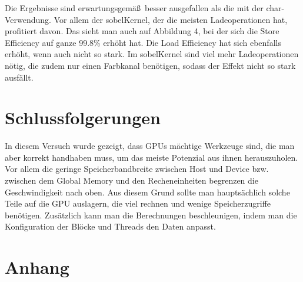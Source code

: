 \documentclass[12pt,a4paper]{scrartcl}
\begin{document}
Die Ergebnisse sind erwartungsgem\"a\ss\ besser ausgefallen als die mit der char-Verwendung.
Vor allem der sobelKernel, der die meisten Ladeoperationen hat, profitiert davon.
Das sieht man auch auf Abbildung 4, bei der sich die Store Efficiency auf ganze 99.8\% erh\"oht hat.
Die Load Efficiency hat sich ebenfalls erh\"oht, wenn auch nicht so stark.
Im sobelKernel sind viel mehr Ladeoperationen n\"otig, die zudem nur einen Farbkanal ben\"otigen, sodass der Effekt nicht so stark ausf\"allt.


\section{Schlussfolgerungen}
In diesem Versuch wurde gezeigt, dass GPUs m\"achtige Werkzeuge sind, die man aber korrekt handhaben muss, um das meiste Potenzial aus ihnen herauszuholen.
Vor allem die geringe Speicherbandbreite zwischen Host und Device bzw. zwischen dem Global Memory und den Recheneinheiten begrenzen die Geschwindigkeit nach oben.
Aus diesem Grund sollte man haupts\"achlich solche Teile auf die GPU auslagern, die viel rechnen und wenige Speicherzugriffe ben\"otigen.
Zus\"atzlich kann man die Berechnungen beschleunigen, indem man die Konfiguration der Bl\"ocke und Threads den Daten anpasst.

\section{Anhang}

\end{document}
